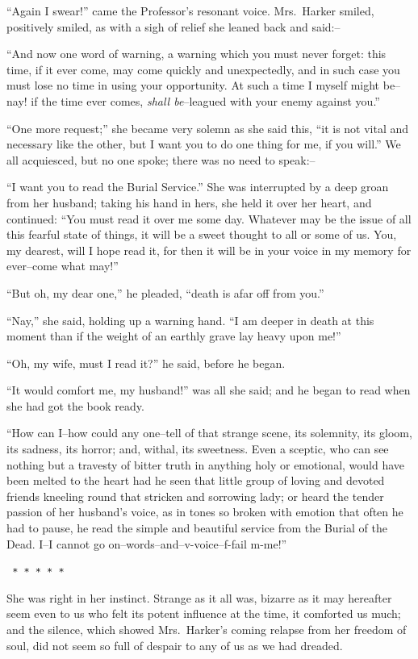 \documentclass[12pt,openright]{book}
\begin{document}
“Again I swear!” came the Professor’s resonant voice. Mrs. Harker smiled, positively smiled, as with a sigh of relief she leaned back and said:–

“And now one word of warning, a warning which you must never forget: this time, if it ever come, may come quickly and unexpectedly, and in such case you must lose no time in using your opportunity. At such a time I myself might be–nay! if the time ever comes, \textit{shall be}–leagued with your enemy against you.”

“One more request;” she became very solemn as she said this, “it is not vital and necessary like the other, but I want you to do one thing for me, if you will.” We all acquiesced, but no one spoke; there was no need to speak:–

“I want you to read the Burial Service.” She was interrupted by a deep groan from her husband; taking his hand in hers, she held it over her heart, and continued: “You must read it over me some day. Whatever may be the issue of all this fearful state of things, it will be a sweet thought to all or some of us. You, my dearest, will I hope read it, for then it will be in your voice in my memory for ever–come what may!”

“But oh, my dear one,” he pleaded, “death is afar off from you.”

“Nay,” she said, holding up a warning hand. “I am deeper in death at this moment than if the weight of an earthly grave lay heavy upon me!”

“Oh, my wife, must I read it?” he said, before he began.

“It would comfort me, my husband!” was all she said; and he began to read when she had got the book ready.

“How can I–how could any one–tell of that strange scene, its solemnity, its gloom, its sadness, its horror; and, withal, its sweetness. Even a sceptic, who can see nothing but a travesty of bitter truth in anything holy or emotional, would have been melted to the heart had he seen that little group of loving and devoted friends kneeling round that stricken and sorrowing lady; or heard the tender passion of her husband’s voice, as in tones so broken with emotion that often he had to pause, he read the simple and beautiful service from the Burial of the Dead. I–I cannot go on–words–and–v-voice–f-fail m-me!”

\texttt{   *       *       *       *       *}

She was right in her instinct. Strange as it all was, bizarre as it may hereafter seem even to us who felt its potent influence at the time, it comforted us much; and the silence, which showed Mrs. Harker’s coming relapse from her freedom of soul, did not seem so full of despair to any of us as we had dreaded.
\end{document}
